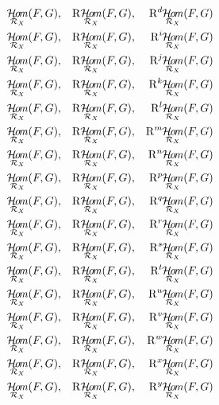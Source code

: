 \documentclass{article}
\newcommand{\Rder}[1][]{\mathop{\mathrm{R}^{#1}\!}\nolimits}
\DeclareMathOperator{\HOM}{\mathcal{H}\!\mathit{o\!m}}
\newcommand{\RHOM}[1][]{\Rder[#1]\mkern-1mu\HOM}
\newcommand{\sheaf}[1]{\mathcal{#1}}
\newcommand{\structuresheaf}[1]{\sheaf{R}_{#1}}
\begin{document}
\begin{align}
    \HOM_{\structuresheaf{X}}(F,G),&& \RHOM[]_{\structuresheaf{X}}(F,G),&& \RHOM[d]_{\structuresheaf{X}}(F,G)\\
    \HOM_{\structuresheaf{X}}(F,G),&& \RHOM[]_{\structuresheaf{X}}(F,G),&& \RHOM[i]_{\structuresheaf{X}}(F,G)\\
    \HOM_{\structuresheaf{X}}(F,G),&& \RHOM[]_{\structuresheaf{X}}(F,G),&& \RHOM[j]_{\structuresheaf{X}}(F,G)\\
    \HOM_{\structuresheaf{X}}(F,G),&& \RHOM[]_{\structuresheaf{X}}(F,G),&& \RHOM[k]_{\structuresheaf{X}}(F,G)\\
    \HOM_{\structuresheaf{X}}(F,G),&& \RHOM[]_{\structuresheaf{X}}(F,G),&& \RHOM[l]_{\structuresheaf{X}}(F,G)\\
    \HOM_{\structuresheaf{X}}(F,G),&& \RHOM[]_{\structuresheaf{X}}(F,G),&& \RHOM[m]_{\structuresheaf{X}}(F,G)\\
    \HOM_{\structuresheaf{X}}(F,G),&& \RHOM[]_{\structuresheaf{X}}(F,G),&& \RHOM[n]_{\structuresheaf{X}}(F,G)\\
    \HOM_{\structuresheaf{X}}(F,G),&& \RHOM[]_{\structuresheaf{X}}(F,G),&& \RHOM[p]_{\structuresheaf{X}}(F,G)\\
    \HOM_{\structuresheaf{X}}(F,G),&& \RHOM[]_{\structuresheaf{X}}(F,G),&& \RHOM[q]_{\structuresheaf{X}}(F,G)\\
    \HOM_{\structuresheaf{X}}(F,G),&& \RHOM[]_{\structuresheaf{X}}(F,G),&& \RHOM[r]_{\structuresheaf{X}}(F,G)\\
    \HOM_{\structuresheaf{X}}(F,G),&& \RHOM[]_{\structuresheaf{X}}(F,G),&& \RHOM[s]_{\structuresheaf{X}}(F,G)\\
    \HOM_{\structuresheaf{X}}(F,G),&& \RHOM[]_{\structuresheaf{X}}(F,G),&& \RHOM[t]_{\structuresheaf{X}}(F,G)\\
    \HOM_{\structuresheaf{X}}(F,G),&& \RHOM[]_{\structuresheaf{X}}(F,G),&& \RHOM[u]_{\structuresheaf{X}}(F,G)\\
    \HOM_{\structuresheaf{X}}(F,G),&& \RHOM[]_{\structuresheaf{X}}(F,G),&& \RHOM[v]_{\structuresheaf{X}}(F,G)\\
    \HOM_{\structuresheaf{X}}(F,G),&& \RHOM[]_{\structuresheaf{X}}(F,G),&& \RHOM[w]_{\structuresheaf{X}}(F,G)\\
    \HOM_{\structuresheaf{X}}(F,G),&& \RHOM[]_{\structuresheaf{X}}(F,G),&& \RHOM[x]_{\structuresheaf{X}}(F,G)\\
    \HOM_{\structuresheaf{X}}(F,G),&& \RHOM[]_{\structuresheaf{X}}(F,G),&& \RHOM[y]_{\structuresheaf{X}}(F,G)\\

\end{align}
\end{document}
